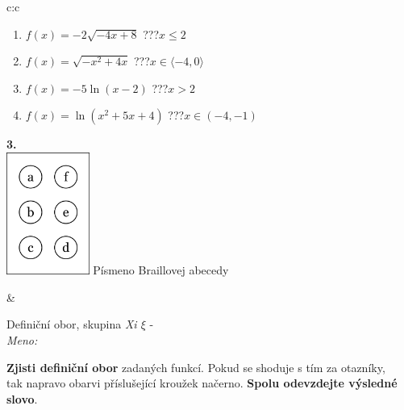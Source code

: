 \documentclass[10pt]{report}
\begin{document}
\begin{tabular}{c:c}
\begin{minipage}[c][104.5mm][t]{0.5\linewidth}
\begin{center}
\begin{minipage}{0.79\linewidth}
\begin{center}
\begin{varwidth}{\linewidth}
\begin{enumerate}
\item $f(x)=-2\sqrt{-4x+8}$\quad \dotfill\; ???\;\dotfill \quad $x\leq2$
\item $f(x)=\sqrt{-x^2+4x}$\quad \dotfill\; ???\;\dotfill \quad $x\in\langle-4 , 0\rangle$
\item $f(x)=-5\ln{(x-2)}$\quad \dotfill\; ???\;\dotfill \quad $x>2$
\item $f(x)=\ln{(x^2+5x+4)}$\quad \dotfill\; ???\;\dotfill \quad $x\in(-4 , -1)$
\end{enumerate}
\end{varwidth}
\end{center}
\end{minipage}
\begin{minipage}{0.20\linewidth}
\begin{center}
{\Huge\bfseries 3.} \\[2mm]
\includegraphics[height=40mm]{../images/braille.png}
{\small Písmeno Braillovej abecedy}
\end{center}
\end{minipage}
\end{center}
\end{minipage}
&
\begin{minipage}[c][104.5mm][t]{0.5\linewidth}
\begin{center}
\vspace{7mm}
{\huge Definiční obor, skupina \textit{Xi $\xi$} -}\\[5mm]
\textit{Meno:}\phantom{xxxxxxxxxxxxxxxxxxxxxxxxxxxxxxxxxxxxxxxxxxxxxxxxxxxxxxxxxxxxxxxxx}\\[5mm]
\begin{minipage}{0.95\linewidth}
\textbf{Zjisti definiční obor} zadaných funkcí. Pokud se shoduje s tím za otazníky,\\tak napravo obarvi příslušející kroužek načerno. \textbf{Spolu odevzdejte výsledné slovo}.
\end{minipage}
\\[1mm]
\begin{minipage}{0.79\linewidth}
\begin{center}
\begin{varwidth}{\linewidth}

\end{varwidth}
\end{center}
\end{minipage}
\end{center}
\end{minipage}
\end{tabular}
\end{document}
